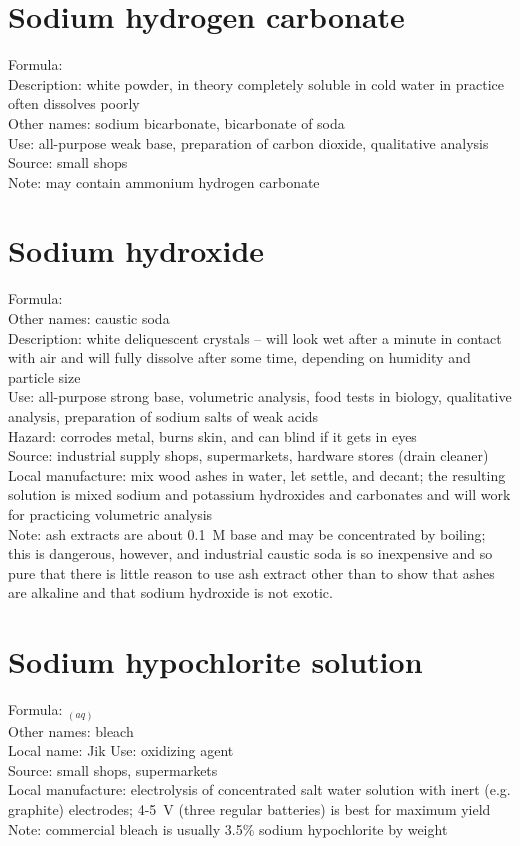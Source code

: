 \section{Sodium hydrogen carbonate}
Formula: \\
Description: white powder, 
in theory completely soluble in cold water 
in practice often dissolves poorly\\
Other names: sodium bicarbonate, 
bicarbonate of soda\\
Use: all-purpose weak base, 
preparation of carbon dioxide, 
qualitative analysis\\
Source: small shops \\
Note: may contain ammonium hydrogen carbonate

\section{Sodium hydroxide}
Formula: \\
Other names: caustic soda\\
Description: white deliquescent crystals -- 
will look wet after a minute in contact with air 
and will fully dissolve after some time, 
depending on humidity and particle size\\ 
Use: all-purpose strong base, 
volumetric analysis, 
food tests in biology, 
qualitative analysis, 
preparation of sodium salts of weak acids\\
Hazard: corrodes metal, 
burns skin, 
and can blind if it gets in eyes\\
Source: industrial supply shops, 
supermarkets, 
hardware stores (drain cleaner)\\
Local manufacture: mix wood ashes in water, 
let settle, 
and decant; 
the resulting solution is mixed sodium and potassium hydroxides 
and carbonates and will work for practicing volumetric analysis\\
Note: ash extracts are about 0.1~M base and may be concentrated by boiling; 
this is dangerous, 
however, 
and industrial caustic soda is so inexpensive 
and so pure that there is little reason to use ash extract 
other than to show that ashes are alkaline 
and that sodium hydroxide is not exotic.

\section{Sodium hypochlorite solution}
Formula: $_{(aq)}$\\
Other names: bleach\\
Local name: Jik
Use: oxidizing agent\\
Source: small shops, 
supermarkets\\
Local manufacture: electrolysis of concentrated salt water solution 
with inert (e.g. 
graphite) electrodes; 
4-5~V (three regular batteries) is best for maximum yield\\
Note: commercial bleach is usually 3.5\% sodium hypochlorite by weight

